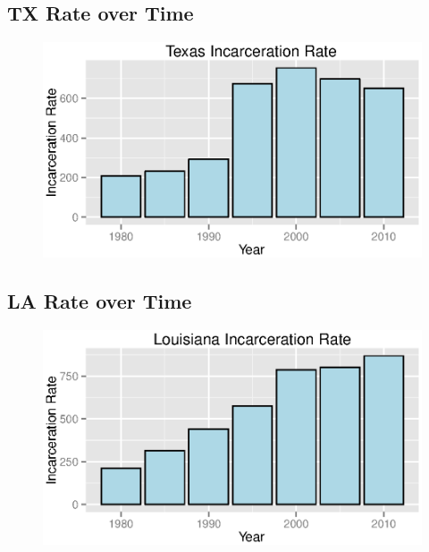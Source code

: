 \documentclass{exam}
\begin{document}
  \subsection{TX Rate over Time}
  \begin{figure}[H]
    \centering
    \includegraphics[scale = 0.9]{tx_rate.eps}
  \end{figure}

  \subsection{LA Rate over Time}
  \begin{figure}[H]
    \centering
    \includegraphics[scale = 0.9]{la_rate.eps}
  \end{figure}
\end{document}
